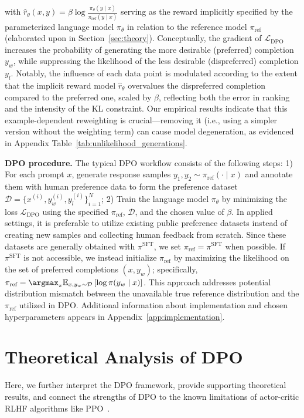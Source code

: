 with $\hat{r}_\theta(x, y) = \beta \log \frac{\pi_\theta(y \mid x)}{\pi_\text{ref}(y \mid x)}$ serving as the reward implicitly specified by the parameterized language model $\pi_\theta$ in relation to the reference model $\pi_\text{ref}$ (elaborated upon in Section~\ref{sec:theory}). Conceptually, the gradient of $\mathcal{L}_\text{DPO}$ increases the probability of generating the more desirable (preferred) completion $y_w$, while suppressing the likelihood of the less desirable (dispreferred) completion $y_l$. Notably, the influence of each data point is modulated according to the extent that the implicit reward model $\hat{r}_\theta$ overvalues the dispreferred completion compared to the preferred one, scaled by $\beta$, reflecting both the error in ranking and the intensity of the KL constraint. Our empirical results indicate that this example-dependent reweighting is crucial—removing it (i.e., using a simpler version without the weighting term) can cause model degeneration, as evidenced in Appendix Table~\ref{tab:unlikelihood_generations}.

\textbf{DPO procedure.} The typical DPO workflow consists of the following steps: 1) For each prompt $x$, generate response samples $y_1, y_2 \sim \pi_\text{ref}(\cdot \mid x)$ and annotate them with human preference data to form the preference dataset $\mathcal{D} = \{x^{(i)}, y_w^{(i)}, y_l^{(i)}\}_{i=1}^N$; 2) Train the language model $\pi_\theta$ by minimizing the loss $\mathcal{L}_\text{DPO}$ using the specified $\pi_\text{ref}$, $\mathcal{D}$, and the chosen value of $\beta$. 
In applied settings, it is preferable to utilize existing public preference datasets instead of creating new samples and collecting human feedback from scratch. Since these datasets are generally obtained with $\pi^\text{SFT}$, we set $\pi_\text{ref} = \pi^\text{SFT}$ when possible. If $\pi^\text{SFT}$ is not accessible, we instead initialize $\pi_\text{ref}$ by maximizing the likelihood on the set of preferred completions ${(x, y_w)}$; specifically, ${\pi_\text{ref} = \argmax_{\pi}\mathbb{E}_{x, y_w \sim \mathcal{D}}\left[\log \pi(y_w \mid x)\right]}$. This approach addresses potential distribution mismatch between the unavailable true reference distribution and the $\pi_\text{ref}$ utilized in DPO. Additional information about implementation and chosen hyperparameters appears in Appendix~\ref{app:implementation}.

\section{Theoretical Analysis of DPO} Here, we further interpret the DPO framework, provide supporting theoretical results, and connect the strengths of DPO to the known limitations of actor-critic RLHF algorithms like PPO~\cite{schulman2017proximal}.

